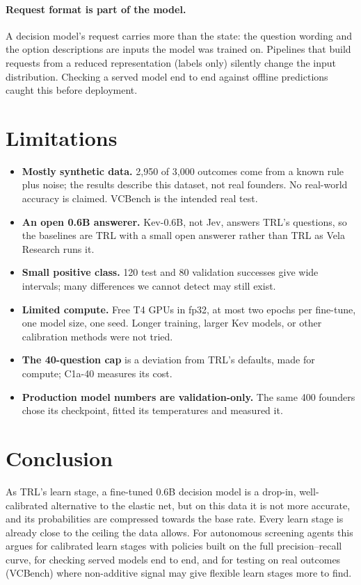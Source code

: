 \documentclass{article}
\newcommand{\cond}[1]{#1}
\begin{document}
\paragraph{Request format is part of the model.} A decision model's request carries more than the
state: the question wording and the option descriptions are inputs the model was trained on.
Pipelines that build requests from a reduced representation (labels only) silently change the
input distribution. Checking a served model end to end against offline predictions caught this
before deployment.

\section{Limitations}

\begin{itemize}
\item \textbf{Mostly synthetic data.} 2,950 of 3,000 outcomes come from a known rule plus noise; the
  results describe this dataset, not real founders. No real-world accuracy is claimed. VCBench is
  the intended real test.
\item \textbf{An open 0.6B answerer.} Kev-0.6B, not Jev, answers TRL's questions, so the baselines
  are TRL with a small open answerer rather than TRL as Vela Research runs it.
\item \textbf{Small positive class.} 120 test and 80 validation successes give wide intervals; many
  differences we cannot detect may still exist.
\item \textbf{Limited compute.} Free T4 GPUs in fp32, at most two epochs per fine-tune, one model
  size, one seed. Longer training, larger Kev models, or other calibration methods were not tried.
\item \textbf{The 40-question cap} is a deviation from TRL's defaults, made for compute; \cond{C1a-40}
  measures its cost.
\item \textbf{Production model numbers are validation-only.} The same 400 founders chose its
  checkpoint, fitted its temperatures and measured it.
\end{itemize}

\section{Conclusion}

As TRL's learn stage, a fine-tuned 0.6B decision model is a drop-in, well-calibrated alternative
to the elastic net, but on this data it is not more accurate, and its probabilities are compressed
towards the base rate. Every learn stage is already close to the ceiling the data allows. For
autonomous screening agents this argues for calibrated learn stages with policies built on the full
precision--recall curve, for checking served models end to end, and for testing on real outcomes
(VCBench) where non-additive signal may give flexible learn stages more to find.
\end{document}
